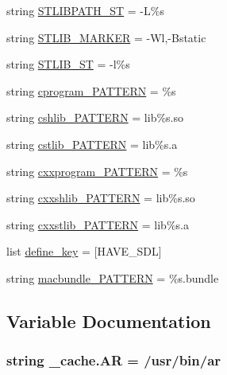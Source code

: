 \begin{DoxyCompactItemize}
string \hyperlink{namespace__cache_a91e18348882808b590aed5ce26db87e0}{S\+T\+L\+I\+B\+P\+A\+T\+H\+\_\+\+ST} = \textquotesingle{}-\/L\%s\textquotesingle{}
\item 
string \hyperlink{namespace__cache_a9f711f7e3a1b25acfbcbbad6cba1026f}{S\+T\+L\+I\+B\+\_\+\+M\+A\+R\+K\+ER} = \textquotesingle{}-\/Wl,-\/Bstatic\textquotesingle{}
\item 
string \hyperlink{namespace__cache_a9d5f1792c4a07ac4c27867a0f1e5db55}{S\+T\+L\+I\+B\+\_\+\+ST} = \textquotesingle{}-\/l\%s\textquotesingle{}
\item 
string \hyperlink{namespace__cache_a2cb3df61e0276c3f8f45dd081fb2ae4b}{cprogram\+\_\+\+P\+A\+T\+T\+E\+RN} = \textquotesingle{}\%s\textquotesingle{}
\item 
string \hyperlink{namespace__cache_aaa130c3486804d849875ae70dd7cc6ea}{cshlib\+\_\+\+P\+A\+T\+T\+E\+RN} = \textquotesingle{}lib\%s.\+so\textquotesingle{}
\item 
string \hyperlink{namespace__cache_a9ba0eebd2bbfb275d205d2857fcc6f6c}{cstlib\+\_\+\+P\+A\+T\+T\+E\+RN} = \textquotesingle{}lib\%s.\+a\textquotesingle{}
\item 
string \hyperlink{namespace__cache_aeea7a6fab3e8d3e212139a45f01dbc3e}{cxxprogram\+\_\+\+P\+A\+T\+T\+E\+RN} = \textquotesingle{}\%s\textquotesingle{}
\item 
string \hyperlink{namespace__cache_a2e08c97bfa7b73a5731db588a3a3fd3a}{cxxshlib\+\_\+\+P\+A\+T\+T\+E\+RN} = \textquotesingle{}lib\%s.\+so\textquotesingle{}
\item 
string \hyperlink{namespace__cache_a3b5edc0767af3039189b57a7811002f9}{cxxstlib\+\_\+\+P\+A\+T\+T\+E\+RN} = \textquotesingle{}lib\%s.\+a\textquotesingle{}
\item 
list \hyperlink{namespace__cache_ad68aab9d6304c09cd1533dc41ecad39f}{define\+\_\+key} = \mbox{[}\textquotesingle{}H\+A\+V\+E\+\_\+\+S\+DL\textquotesingle{}\mbox{]}
\item 
string \hyperlink{namespace__cache_a540987b8beb6c8bb9f857f8be42e9d51}{macbundle\+\_\+\+P\+A\+T\+T\+E\+RN} = \textquotesingle{}\%s.\+bundle\textquotesingle{}
\end{DoxyCompactItemize}


\subsection{Variable Documentation}
\subsubsection[{\texorpdfstring{AR}{AR}}]{\setlength{\rightskip}{0pt plus 5cm}string \+\_\+cache.\+AR = \textquotesingle{}/usr/bin/ar\textquotesingle{}}\hypertarget{namespace__cache_a9d44e2832ad98b40a7f591b4471b7814}{}\label{namespace__cache_a9d44e2832ad98b40a7f591b4471b7814}
